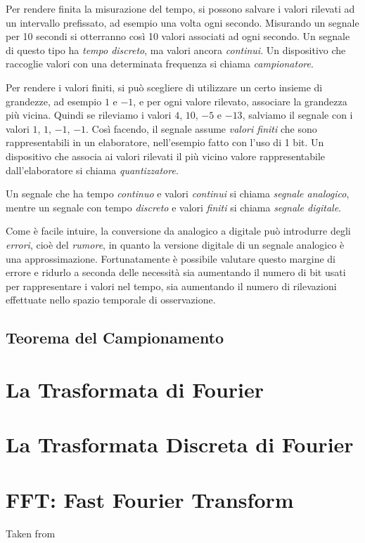 Per rendere finita la misurazione del tempo, si possono salvare i valori
rilevati ad un intervallo prefissato, ad esempio una volta ogni secondo.
Misurando un segnale per 10 secondi si otterranno cos\`i 10 valori associati ad
ogni secondo. Un segnale di questo tipo ha \emph{tempo discreto}, ma valori
ancora \emph{continui}. Un dispositivo che raccoglie valori con una determinata
frequenza si chiama \emph{campionatore}.

Per rendere i valori finiti, si pu\`o scegliere di utilizzare un certo insieme
di grandezze, ad esempio $1$ e $-1$, e per ogni valore rilevato, associare la
grandezza pi\`u vicina. Quindi se rileviamo i valori $4$, $10$, $-5$ e $-13$,
salviamo il segnale con i valori $1$, $1$, $-1$, $-1$. Cos\`i facendo, il
segnale assume \emph{valori finiti} che sono rappresentabili in un elaboratore,
nell'esempio fatto con l'uso di 1 bit. Un dispositivo che associa ai valori
rilevati il pi\`u vicino valore rappresentabile dall'elaboratore si chiama
\emph{quantizzatore}.

Un segnale che ha tempo \emph{continuo} e valori \emph{continui} si chiama
\emph{segnale analogico}, mentre un segnale con tempo \emph{discreto} e valori
\emph{finiti} si chiama \emph{segnale digitale}.

Come \`e facile intuire, la conversione da analogico a digitale pu\`o introdurre
degli \emph{errori}, cio\`e del \emph{rumore}, in quanto la versione digitale di
un segnale analogico \`e una approssimazione. Fortunatamente \`e possibile
valutare questo margine di errore e ridurlo a seconda delle necessit\`a sia
aumentando il numero di bit usati per rappresentare i valori nel tempo, sia
aumentando il numero di rilevazioni effettuate nello spazio temporale di
osservazione.
\subsection{Teorema del Campionamento}
\section{La Trasformata di Fourier}
\section{La Trasformata Discreta di Fourier}
\section{FFT: Fast Fourier Transform}
Taken from \cite{bertoni}
